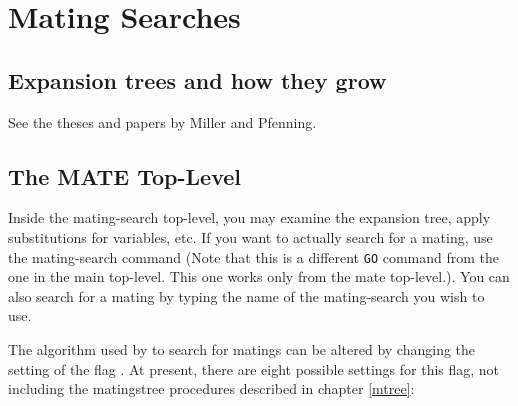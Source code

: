\chapter{Mating Searches}\label{ms-guide}

\section{Expansion trees and how they grow}
See the theses and papers by Miller and Pfenning.

\section{The MATE Top-Level}

Inside the mating-search top-level, you
may examine the expansion tree, apply substitutions for variables,
etc.  If you want to actually search for a mating, use the
 mating-search command (Note that this is a different
{\tt GO} command from the one in the main top-level. This one works only from
the mate top-level.). You can also search for a mating by typing the name
of the mating-search you wish to use.



The algorithm used by {\TPS} to search for matings can be altered by changing
the setting of the flag . At present, there are eight
possible settings for this flag, not including the matingstree procedures described in
chapter \ref{mtree}:

